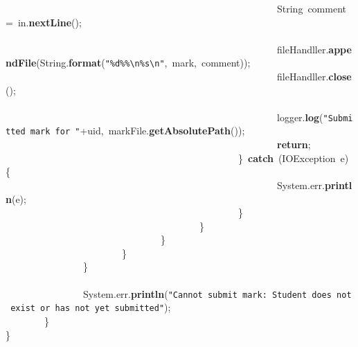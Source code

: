 \mbox{}\ \ \ \ \ \ \ \ \ \ \ \ \ \ \ \ \ \ \ \ \ \ \ \ \ \ \ \ \ \ \ \ \ \ \ \ \ \ \ \ \ \ \ \ \ \ \ \ \ \ \ \ \ \ \ \ String\ comment\ =\ in.\textbf{nextLine}(); \\
\mbox{}\ \ \ \ \ \ \ \ \ \ \ \ \ \ \ \ \ \ \ \ \ \ \ \ \ \ \ \ \ \ \ \ \ \ \ \ \ \ \ \ \ \ \ \ \ \ \ \  \\
\mbox{}\ \ \ \ \ \ \ \ \ \ \ \ \ \ \ \ \ \ \ \ \ \ \ \ \ \ \ \ \ \ \ \ \ \ \ \ \ \ \ \ \ \ \ \ \ \ \ \ \ \ \ \ \ \ \ \ fileHandller.\textbf{appendFile}(String.\textbf{format}(\texttt{"{}\%d\%\%}\texttt{\textbackslash{}n}\texttt{\%s}\texttt{\textbackslash{}n}\texttt{"{}},\ mark,\ comment)); \\
\mbox{}\ \ \ \ \ \ \ \ \ \ \ \ \ \ \ \ \ \ \ \ \ \ \ \ \ \ \ \ \ \ \ \ \ \ \ \ \ \ \ \ \ \ \ \ \ \ \ \ \ \ \ \ \ \ \ \ fileHandller.\textbf{close}(); \\
\mbox{} \\
\mbox{}\ \ \ \ \ \ \ \ \ \ \ \ \ \ \ \ \ \ \ \ \ \ \ \ \ \ \ \ \ \ \ \ \ \ \ \ \ \ \ \ \ \ \ \ \ \ \ \ \ \ \ \ \ \ \ \ logger.\textbf{log}(\texttt{"{}Submitted\ mark\ for\ "{}}+uid,\ markFile.\textbf{getAbsolutePath}()); \\
\mbox{}\ \ \ \ \ \ \ \ \ \ \ \ \ \ \ \ \ \ \ \ \ \ \ \ \ \ \ \ \ \ \ \ \ \ \ \ \ \ \ \ \ \ \ \ \ \ \ \ \ \ \ \ \ \ \ \ \textbf{return}; \\
\mbox{}\ \ \ \ \ \ \ \ \ \ \ \ \ \ \ \ \ \ \ \ \ \ \ \ \ \ \ \ \ \ \ \ \ \ \ \ \ \ \ \ \ \ \ \ \ \ \ \ \}\ \textbf{catch}\ (IOException\ e)\ \{ \\
\mbox{}\ \ \ \ \ \ \ \ \ \ \ \ \ \ \ \ \ \ \ \ \ \ \ \ \ \ \ \ \ \ \ \ \ \ \ \ \ \ \ \ \ \ \ \ \ \ \ \ \ \ \ \ \ \ \ \ System.err.\textbf{println}(e); \\
\mbox{}\ \ \ \ \ \ \ \ \ \ \ \ \ \ \ \ \ \ \ \ \ \ \ \ \ \ \ \ \ \ \ \ \ \ \ \ \ \ \ \ \ \ \ \ \ \ \ \ \} \\
\mbox{}\ \ \ \ \ \ \ \ \ \ \ \ \ \ \ \ \ \ \ \ \ \ \ \ \ \ \ \ \ \ \ \ \ \ \ \ \ \ \ \ \} \\
\mbox{}\ \ \ \ \ \ \ \ \ \ \ \ \ \ \ \ \ \ \ \ \ \ \ \ \ \ \ \ \ \ \ \ \} \\
\mbox{}\ \ \ \ \ \ \ \ \ \ \ \ \ \ \ \ \ \ \ \ \ \ \ \ \} \\
\mbox{}\ \ \ \ \ \ \ \ \ \ \ \ \ \ \ \ \} \\
\mbox{} \\
\mbox{}\ \ \ \ \ \ \ \ \ \ \ \ \ \ \ \ System.err.\textbf{println}(\texttt{"{}Cannot\ submit\ mark:\ Student\ does\ not\ exist\ or\ has\ not\ yet\ submitted"{}}); \\
\mbox{}\ \ \ \ \ \ \ \ \} \\
\mbox{}\} \\

\clearpage
